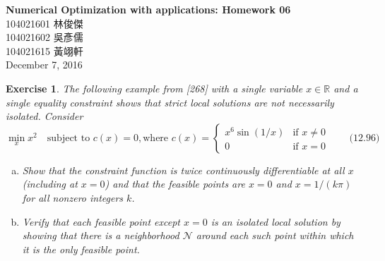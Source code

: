 \documentclass[11pt,a4paper]{article}
\renewcommand{\(}{\left(}
\renewcommand{\)}{\right)}
\renewcommand{\title}{Numerical Optimization with applications: Homework 06}
\renewcommand{\author}{104021601 林俊傑\\104021602 吳彥儒\\104021615 黃翊軒}
\renewcommand{\maketitle}{\begin{center}\textbf{\Large\title}\\[6pt] {\author}\\[6pt] {\color{Gray}\footnotesize December 7, 2016}\end{center}}
\newtheorem{exercise}{Exercise}
\begin{document}
  \maketitle

\begin{exercise}
  	 The following example from [268] with a single variable $x \in \mathbb{R}$ and a single equality constraint shows that strict local solutions are not necessarily isolated. Consider
  	 $$
  	 \min_x x^2 \quad \text{subject to } c(x) = 0, \text{where } c(x) = \begin{cases}
	  	 x^6\sin (1/x) &\text{if $x\ne 0$}\\
	  	 0 &\text{if $x = 0$}
  	 \end{cases} \qquad \text{(12.96)}
  	 $$
  	 \begin{enumerate}[(a)]
  	 	\item Show that the constraint function is twice continuously differentiable at all $x$ (including at $x = 0$) and that the feasible points are $x = 0$ and $x = 1/(k\pi)$ for all nonzero integers $k$.
  	 	\item Verify that each feasible point except $x = 0$ is an isolated local solution by showing that there is a neighborhood $\mathcal{N}$ around each such point within which it is the only feasible point.
  	 \end{enumerate}
  \end{exercise}
\end{document}
